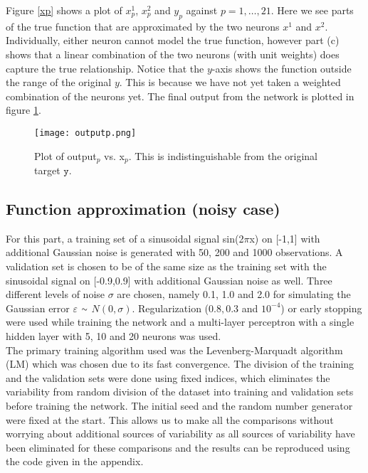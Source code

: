 \documentclass[paper=a4, fontsize=11pt]{scrartcl} %
\newcommand{\mytilde}{\raise.17ex\hbox{$\scriptstyle\mathtt{\sim}$}}
\numberwithin{equation}{section} %
\begin{document}
Figure \ref{xp} shows a plot of $x_p^1$, $x_p^2$ and $y_p$ against $p = 1, \ldots,21$. Here we see parts of the true function that are approximated by the two neurons $x^1$ and $x^2$. Individually, either neuron cannot model the true function, however part (c) shows that a linear combination of the two neurons (with unit weights) does capture the true relationship. Notice that the $y$-axis shows the function outside the range of the original $y$. This is because we have not yet taken a weighted combination of the neurons yet. The final output from the network is plotted in figure \ref{output}.

\begin{figure}[ht]
\centering
\texttt{[image: outputp.png]}
\caption{Plot of output$_p$ vs. x$_p$. This is indistinguishable from the original target $\mathtt{y}$.}
\label{output}
\end{figure}

\subsection{Function approximation (noisy case)}
For this part, a training set of a sinusoidal signal sin(2$\pi$x) on [-1,1] with additional Gaussian noise is generated with 50, 200 and 1000 observations. A validation set is chosen to be of the same size as the training set with the sinusoidal signal on [-0.9,0.9] with additional Gaussian noise as well. Three different levels of noise $\sigma$ are chosen, namely 0.1, 1.0 and 2.0 for simulating the Gaussian error $\varepsilon$ $\mytilde$ $N(0,\sigma)$. Regularization ($0.8, 0.3$ and $10^{-4}$) or early stopping were used while training the network and a multi-layer perceptron with a single hidden layer with 5, 10 and 20 neurons was used. \\

The primary training algorithm used was the Levenberg-Marquadt algorithm (LM) which was chosen due to its fast convergence. The division of the training and the validation sets were done using fixed indices, which eliminates the variability from random division of the dataset into training and validation sets before training the network. The initial seed and the random number generator were fixed at the start. This allows us to make all the comparisons without worrying about additional sources of variability as all sources of variability have been eliminated for these comparisons and the results can be reproduced using the code given in the appendix.\\
\end{document}
